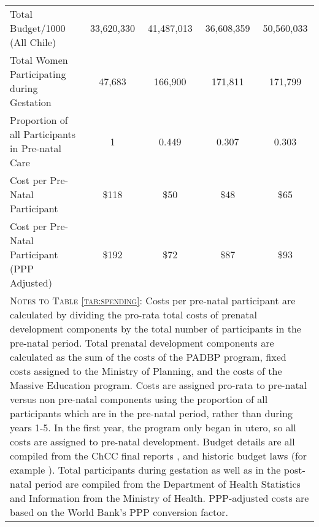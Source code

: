 \documentclass[12pt]{article}
\begin{document}
\begin{spacing}{1.4}
\begin{table}[htpb!]
\begin{tabular}{lcccc}
    Total Budget/1000 (All Chile)                  &33,620,330 &41,487,013 & 36,608,359& 50,560,033\\
    Total Women Participating during Gestation     &47,683     &166,900&171,811&171,799\\
    Proportion of all Participants in Pre-natal Care &1&0.449&0.307&0.303\\
    Cost per Pre-Natal Participant &\$118 & \$50 & \$48 & \$65\\
    Cost per Pre-Natal Participant (PPP Adjusted) &\$192 & \$72 & \$87 & \$93\\
    \midrule
    \multicolumn{5}{p{18.1cm}}{{\footnotesize \textsc{Notes to Table \ref{tab:spending}:}
        Costs per pre-natal participant are calculated by dividing the pro-rata total costs
        of prenatal development components by the total number of participants in the pre-natal
        period.  Total prenatal development components are calculated as the sum of the costs
        of the PADBP program, fixed costs assigned to the Ministry of Planning, and the costs
        of the Massive Education program.  Costs are assigned pro-rata to pre-natal versus non
        pre-natal components using the proportion of all participants which are in the pre-natal
        period, rather than during years 1-5.  In the first year, the program only began in
        utero, so all costs are assigned to pre-natal development.  Budget details are all
        compiled from the ChCC final reports \citep{Arrietetal2013}, and historic budget
        laws (for example \citet{Presupuesto2007}).  Total participants during gestation as
        well as in the post-natal period are compiled from the Department of Health Statistics
        and Information from the Ministry of Health. PPP-adjusted costs are based on the
        World Bank's PPP conversion factor.}} \\ \bottomrule
  \end{tabular}
\end{table}



\end{spacing}
\end{document}
